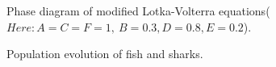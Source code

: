 \documentclass[aps,prl,preprint,superscriptaddress]{revtex4}
\begin{document}
\begin{figure}[H]
	\centering
	\caption{Phase diagram of modified Lotka-Volterra equations($Here: A=C=F=1,\:B=0.3, D=0.8,E=0.2$).}
	\label{more_clusters} 
\end{figure}

\begin{figure}[H]
	\centering
	\caption{Population evolution of fish and sharks.}
	\label{more_clusters} 
\end{figure}
\end{document}
